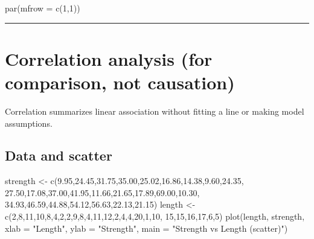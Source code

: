 \documentclass[
  letterpaper,
]{scrbook}
\newenvironment{Shaded}{\begin{snugshade}}{\end{snugshade}}
\newcommand{\AttributeTok}[1]{\textcolor[rgb]{0.40,0.45,0.13}{#1}}
\newcommand{\DecValTok}[1]{\textcolor[rgb]{0.68,0.00,0.00}{#1}}
\newcommand{\FloatTok}[1]{\textcolor[rgb]{0.68,0.00,0.00}{#1}}
\newcommand{\FunctionTok}[1]{\textcolor[rgb]{0.28,0.35,0.67}{#1}}
\newcommand{\NormalTok}[1]{\textcolor[rgb]{0.00,0.23,0.31}{#1}}
\newcommand{\OtherTok}[1]{\textcolor[rgb]{0.00,0.23,0.31}{#1}}
\newcommand{\StringTok}[1]{\textcolor[rgb]{0.13,0.47,0.30}{#1}}
\begin{document}
\begin{Shaded}
\begin{Highlighting}[]
\FunctionTok{par}\NormalTok{(}\AttributeTok{mfrow =} \FunctionTok{c}\NormalTok{(}\DecValTok{1}\NormalTok{,}\DecValTok{1}\NormalTok{))}
\end{Highlighting}
\end{Shaded}

\begin{center}\rule{0.5\linewidth}{0.5pt}\end{center}

\section{Correlation analysis (for comparison, not
causation)}\label{correlation-analysis-for-comparison-not-causation}

Correlation summarizes linear association without fitting a line or
making model assumptions.

\subsection{Data and scatter}\label{data-and-scatter}

\begin{Shaded}
\begin{Highlighting}[]
\NormalTok{strength }\OtherTok{\textless{}{-}} \FunctionTok{c}\NormalTok{(}\FloatTok{9.95}\NormalTok{,}\FloatTok{24.45}\NormalTok{,}\FloatTok{31.75}\NormalTok{,}\FloatTok{35.00}\NormalTok{,}\FloatTok{25.02}\NormalTok{,}\FloatTok{16.86}\NormalTok{,}\FloatTok{14.38}\NormalTok{,}\FloatTok{9.60}\NormalTok{,}\FloatTok{24.35}\NormalTok{,}
              \FloatTok{27.50}\NormalTok{,}\FloatTok{17.08}\NormalTok{,}\FloatTok{37.00}\NormalTok{,}\FloatTok{41.95}\NormalTok{,}\FloatTok{11.66}\NormalTok{,}\FloatTok{21.65}\NormalTok{,}\FloatTok{17.89}\NormalTok{,}\FloatTok{69.00}\NormalTok{,}\FloatTok{10.30}\NormalTok{,}
              \FloatTok{34.93}\NormalTok{,}\FloatTok{46.59}\NormalTok{,}\FloatTok{44.88}\NormalTok{,}\FloatTok{54.12}\NormalTok{,}\FloatTok{56.63}\NormalTok{,}\FloatTok{22.13}\NormalTok{,}\FloatTok{21.15}\NormalTok{)}
\NormalTok{length }\OtherTok{\textless{}{-}} \FunctionTok{c}\NormalTok{(}\DecValTok{2}\NormalTok{,}\DecValTok{8}\NormalTok{,}\DecValTok{11}\NormalTok{,}\DecValTok{10}\NormalTok{,}\DecValTok{8}\NormalTok{,}\DecValTok{4}\NormalTok{,}\DecValTok{2}\NormalTok{,}\DecValTok{2}\NormalTok{,}\DecValTok{9}\NormalTok{,}\DecValTok{8}\NormalTok{,}\DecValTok{4}\NormalTok{,}\DecValTok{11}\NormalTok{,}\DecValTok{12}\NormalTok{,}\DecValTok{2}\NormalTok{,}\DecValTok{4}\NormalTok{,}\DecValTok{4}\NormalTok{,}\DecValTok{20}\NormalTok{,}\DecValTok{1}\NormalTok{,}\DecValTok{10}\NormalTok{,}
            \DecValTok{15}\NormalTok{,}\DecValTok{15}\NormalTok{,}\DecValTok{16}\NormalTok{,}\DecValTok{17}\NormalTok{,}\DecValTok{6}\NormalTok{,}\DecValTok{5}\NormalTok{)}
\FunctionTok{plot}\NormalTok{(length, strength, }\AttributeTok{xlab =} \StringTok{"Length"}\NormalTok{, }\AttributeTok{ylab =} \StringTok{"Strength"}\NormalTok{,}
     \AttributeTok{main =} \StringTok{"Strength vs Length (scatter)"}\NormalTok{)}
\end{Highlighting}
\end{Shaded}
\end{document}
